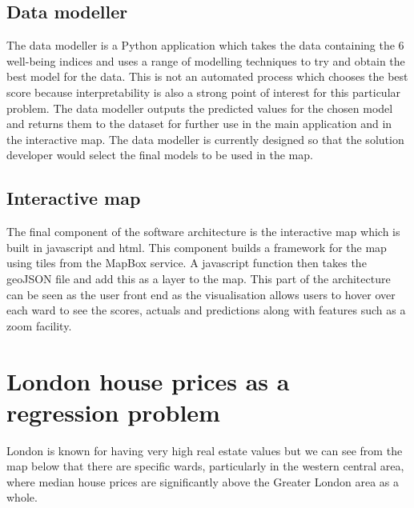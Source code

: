 
\subsection{Data modeller}
The data modeller is a Python application which takes the data containing the 6 well-being indices and uses a range of modelling techniques to try and obtain the best model for the data. This is not an automated process which chooses the best score because interpretability is also a strong point of interest for this particular problem. The data modeller outputs the predicted values for the chosen model and returns them to the dataset for further use in the main application and in the interactive map.
The data modeller is currently designed so that the solution developer would select the final models to be used in the map. 



\subsection{Interactive map}
The final component of the software architecture is the interactive map which is built in javascript and html. This component builds a framework for the map using tiles from the MapBox service. A javascript function then takes the geoJSON file and add this as a layer to the map. This part of the architecture can be seen as the user front end as the visualisation allows users to hover over each ward to see the scores, actuals and predictions along with features such as a zoom facility.


\section{London house prices as a regression problem}

London is known for having very high real estate values but we can see from the map below that there are specific wards, particularly in the western central area, where median house prices are significantly above the Greater London area as a whole.


